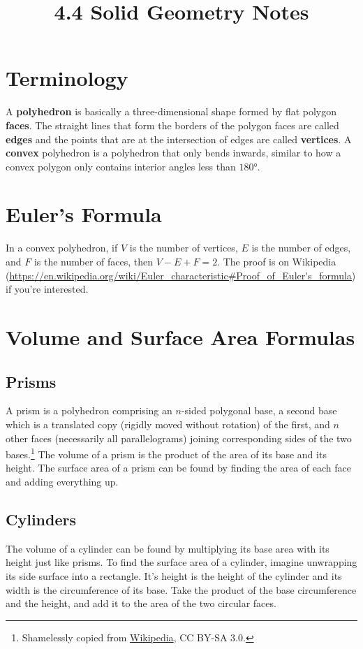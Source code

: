 \documentclass{article}
\title{4.4 Solid Geometry Notes}
\author{}
\date{}
\begin{document}
\maketitle
\begin{multicols}{2}
	\section*{Terminology}
	A \textbf{polyhedron} is basically a three-dimensional shape formed by flat polygon \textbf{faces}.
	The straight lines that form the borders of the polygon faces are called \textbf{edges} and the points that are at the intersection of edges are called \textbf{vertices}.
	A \textbf{convex} polyhedron is a polyhedron that only bends inwards, similar to how a convex polygon only contains interior angles less than $\ang{180}$.

	\section*{Euler's Formula}
	In a convex polyhedron, if $V$ is the number of vertices, $E$ is the number of edges, and $F$ is the number of faces, then $V - E + F = 2$.
	The proof is on Wikipedia (\url{https://en.wikipedia.org/wiki/Euler_characteristic#Proof_of_Euler's_formula}) if you're interested.
	
	\section*{Volume and Surface Area Formulas}
	\subsection*{Prisms}
	A prism is a polyhedron comprising an $n$-sided polygonal base, a second base which is a translated copy (rigidly moved without rotation) of the first, and $n$ other faces (necessarily all parallelograms) joining corresponding sides of the two bases.\footnote{Shamelessly copied from \href{https://en.wikipedia.org/wiki/Prism_(geometry)}{Wikipedia}, CC BY-SA 3.0.}
	The volume of a prism is the product of the area of its base and its height.
	The surface area of a prism can be found by finding the area of each face and adding everything up.

	\subsection*{Cylinders}
	The volume of a cylinder can be found by multiplying its base area with its height just like prisms.
	To find the surface area of a cylinder, imagine unwrapping its side surface into a rectangle.
	It's height is the height of the cylinder and its width is the circumference of its base.
	Take the product of the base circumference and the height, and add it to the area of the two circular faces.


\end{multicols}
\end{document}
